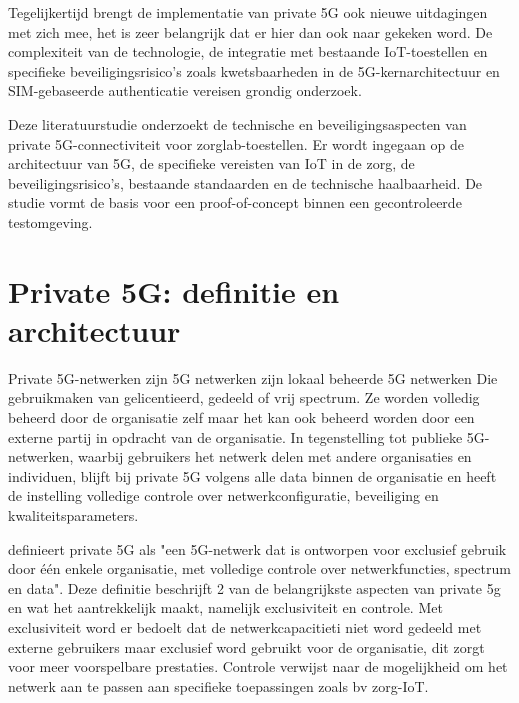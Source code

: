 Tegelijkertijd brengt de implementatie van private 5G ook nieuwe uitdagingen met zich mee, het is zeer belangrijk dat er hier dan ook naar gekeken word. De complexiteit van de technologie, de integratie met bestaande IoT-toestellen en specifieke beveiligingsrisico's zoals kwetsbaarheden in de 5G-kernarchitectuur en SIM-gebaseerde authenticatie vereisen grondig onderzoek\autocite{3GPP2024,ENISA2022}.
\vspace{0.5cm}
\vspace{0.5cm}

Deze literatuurstudie onderzoekt de technische en beveiligingsaspecten van private 5G-connectiviteit voor zorglab-toestellen. Er wordt ingegaan op de architectuur van 5G, de specifieke vereisten van IoT in de zorg, de beveiligingsrisico's, bestaande standaarden en de technische haalbaarheid. De studie vormt de basis voor een proof-of-concept binnen een gecontroleerde testomgeving.

\section{Private 5G: definitie en architectuur}

Private 5G-netwerken zijn 5G netwerken zijn lokaal beheerde 5G netwerken  Die gebruikmaken van gelicentieerd, gedeeld of vrij spectrum. Ze worden volledig beheerd door de organisatie zelf maar het kan ook beheerd worden door een externe partij in opdracht van de organisatie. In tegenstelling tot publieke 5G-netwerken, waarbij gebruikers het netwerk delen met andere organisaties en individuen, blijft bij private 5G  volgens \autocite{ProximusNXT}  alle data binnen de organisatie en heeft de instelling volledige controle over netwerkconfiguratie, beveiliging en kwaliteitsparameters.
\vspace{0.5cm}

\autocite{Aijaz2020} definieert private 5G als "een 5G-netwerk dat is ontworpen voor exclusief gebruik door één enkele organisatie, met volledige controle over netwerkfuncties, spectrum en data". Deze definitie beschrijft 2 van de belangrijkste aspecten van private 5g en wat het aantrekkelijk maakt, namelijk exclusiviteit en controle. Met exclusiviteit word er bedoelt dat de netwerkcapacitieti niet word gedeeld met externe gebruikers maar exclusief word gebruikt voor de organisatie, dit zorgt voor meer voorspelbare prestaties. Controle verwijst naar de mogelijkheid om het netwerk aan te passen aan specifieke toepassingen zoals bv zorg-IoT.
\vspace{0.5cm}

